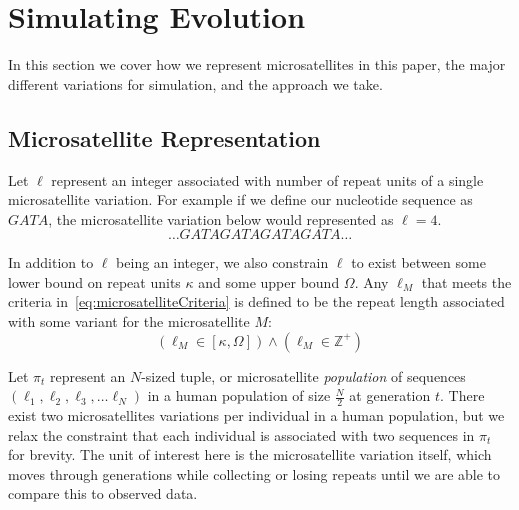 \section{Simulating Evolution}\label{sec:se}
In this section we cover how we represent microsatellites in this paper, the major different variations for simulation,
and the approach we take.

\subsection{Microsatellite Representation}\label{subsec:mr}
Let $\ell$ represent an integer associated with number of repeat units of a single microsatellite variation.
For example if we define our nucleotide sequence as $GATA$, the microsatellite variation below would represented
as $\ell=4$.
\begin{equation*}
    \ldots \mathit{GATAGATAGATAGATA} \ldots
\end{equation*}

In addition to $\ell$ being an integer, we also constrain $\ell$ to exist between some lower bound on repeat units
$\kappa$ and some upper bound $\Omega$.
Any $\ell_M$ that meets the criteria in~\autoref{eq:microsatelliteCriteria} is defined to be the repeat length associated
with some variant for the microsatellite $M$:
\begin{equation}\label{eq:microsatelliteCriteria}
    \left(\ell_M \in [\kappa, \Omega]\right) \land \left(\ell_M \in \mathbb{Z}^+\right)
\end{equation}

Let $\pi_t$ represent an $N$-sized tuple, or microsatellite \emph{population} of sequences
$\left(\ell_1, \ell_2, \ell_3, \ldots \ell_{N}\right)$ in a human population of size $\frac{N}{2}$ at generation $t$.
There exist two microsatellites variations per individual in a human population, but we relax the constraint that
each individual is associated with two sequences in $\pi_t$ for brevity.
The unit of interest here is the microsatellite variation itself, which moves through generations while collecting or
losing repeats until we are able to compare this to observed data.



